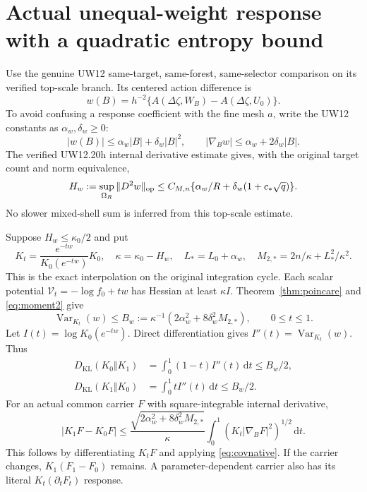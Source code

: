 \documentclass[11pt,letterpaper]{article}
\numberwithin{equation}{section}
\theoremstyle{plain}
\theoremstyle{remark}
\DeclareMathOperator{\Var}{Var}
\newcommand{\dd}{\,\mathrm d}
\newcommand{\KL}{D_{\mathrm{KL}}}
\begin{document}
\section{Actual unequal-weight response with a quadratic entropy bound}
\label{sec:tilt}

Use the genuine UW12 same-target, same-forest, same-selector comparison on its
verified top-scale branch. Its centered action difference is
\begin{equation}
 w(B)=h^{-2}\{A(\Delta\zeta,W_B)-A(\Delta\zeta,U_0)\}.
 \label{eq:tilt}
\end{equation}
To avoid confusing a response coefficient with the fine mesh $a$, write the
UW12 constants as $\alpha_w,\delta_w\ge0$:
\begin{equation}
 |w(B)|\le\alpha_w|B|+\delta_w|B|^2,
 \qquad |\nabla_Bw|\le\alpha_w+2\delta_w|B|.
 \label{eq:wgrad}
\end{equation}
The verified UW12.20h internal derivative estimate gives, with the original
target count and norm equivalence,
\begin{equation}
 H_w:=\sup_{\Omega_R}\|D^2w\|_{\rm op}
 \le C_{M,n}\{\alpha_w/R+\delta_w(1+c_*\sqrt q)\}.
 \label{eq:whess}
\end{equation}
No slower mixed-shell sum is inferred from this top-scale estimate.

Suppose $H_w\le\kappa_0/2$ and put
\[
 K_t=\frac{e^{-tw}}{K_0(e^{-tw})}K_0,\quad
 \kappa=\kappa_0-H_w,\quad L_*=L_0+\alpha_w,\quad
 M_{2,*}=2n/\kappa+L_*^2/\kappa^2.
\]
This is the exact interpolation on the original integration cycle. Each
scalar potential $\mathcal V_t=-\log f_0+tw$ has Hessian at least $\kappa I$.
Theorem~\ref{thm:poincare} and
\eqref{eq:moment2} give
\begin{equation}
 \Var_{K_t}(w)\le B_w:=\kappa^{-1}
             (2\alpha_w^2+8\delta_w^2M_{2,*}),\qquad 0\le t\le1.
 \label{eq:varw}
\end{equation}
Let $I(t)=\log K_0(e^{-tw})$. Direct differentiation gives
$I''(t)=\Var_{K_t}(w)$. Thus
\begin{align}
 \KL(K_0\Vert K_1)&=\int_0^1(1-t)I''(t)\dd t\le B_w/2,\label{eq:entropy1}\\
 \KL(K_1\Vert K_0)&=\int_0^1tI''(t)\dd t\le B_w/2.\label{eq:entropy2}
\end{align}
For an actual common carrier $F$ with square-integrable internal derivative,
\begin{equation}
 |K_1F-K_0F|\le
 \frac{\sqrt{2\alpha_w^2+8\delta_w^2M_{2,*}}}{\kappa}
 \int_0^1(K_t|\nabla_BF|^2)^{1/2}\dd t.
 \label{eq:carrier}
\end{equation}
This follows by differentiating $K_tF$ and applying
\eqref{eq:covnative}. If the carrier changes, $K_1(F_1-F_0)$ remains. A
parameter-dependent carrier also has its literal $K_t(\partial_tF_t)$ response.
\end{document}
